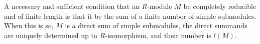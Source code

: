 A necessary and sufficient condition that an $R$-module $M$ be completely reducible and of finite length is that it be the sum of a finite number of simple submodules. When this is so, $M$ is a direct sum of simple submodules, the direct summands are uniquely determined up to $R$-isomorphism, and their number is $l(M)$.
